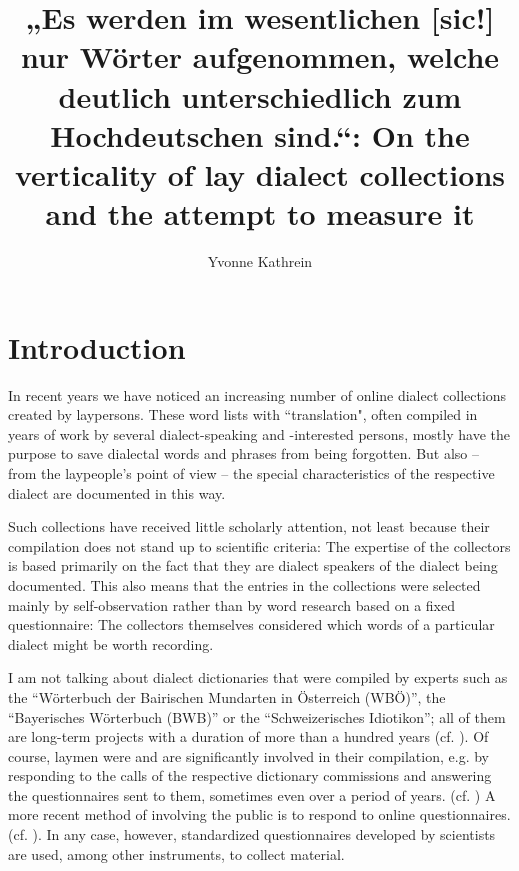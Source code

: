 \documentclass[output=paper]{langscibook}
\author{Yvonne Kathrein\orcid{}\affiliation{University of Innsbruck, Department of German Studies, Tyrolean Dialect Archive}}
\title[On the verticality of lay dialect collections and the attempt to measure it]{„Es werden im wesentlichen [sic!] nur Wörter aufgenommen, welche deutlich unterschiedlich zum Hochdeutschen sind.“: On the verticality of lay dialect collections and the attempt to measure it}
\begin{document}
\graphicspath{{figures/kathrein}}
\maketitle
\label{chap:kathrein}

\section{Introduction}
\label{sec:kathrein:1}
In recent years we have noticed an increasing number of online dialect collections created by laypersons. These word lists with ``translation", often compiled in years of work by several dialect-speaking and -interested persons, mostly have the purpose to save dialectal words and phrases from being forgotten. But also – from the laypeople's point of view – the special characteristics of the respective dialect are documented in this way.

Such collections have received little scholarly attention, not least because their compilation does not stand up to scientific criteria: The expertise of the collectors is based primarily on the fact that they are dialect speakers of the dialect being documented. This also means that the entries in the collections were selected mainly by self-observation rather than by word research based on a fixed questionnaire: The collectors themselves considered which words of a particular dialect might be worth recording. 

I am not talking about dialect dictionaries that were compiled by experts such as the “Wörterbuch der Bairischen Mundarten in Österreich (WBÖ)”, the “Bayerisches Wörterbuch (BWB)” or the “Schweizerisches Idiotikon”; all of them are long-term projects with a duration of more than a hundred years (cf. \citealt{Stöckle2020, SchnabelEtAl2020, LandoltRoth2020}). Of course, laymen were and are significantly involved in their compilation, e.g. by responding to the calls of the respective dictionary commissions and answering the questionnaires sent to them, sometimes even over a period of years. (cf. \cites[vii--viii]{DollmayrKranzmayer1963}[144]{LandoltRoth2020}[v, xi--xiv]{DenzEtAl2002}) A more recent method of involving the public is to respond to online questionnaires. (cf. \citealt{Retti1999, HoferMeier2015}). In any case, however, standardized questionnaires developed by scientists are used, among other instruments, to collect material.
\end{document}
